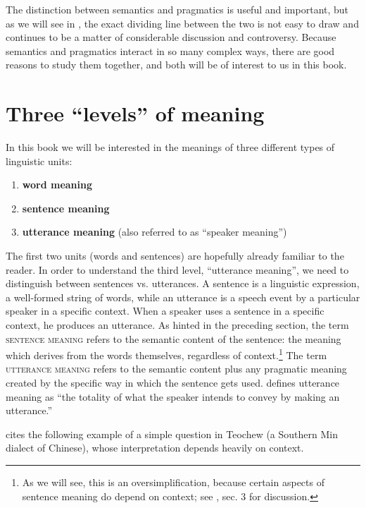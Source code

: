 The distinction between semantics and pragmatics is useful and important, but as we will see in , the exact dividing line between the two is not easy to draw and continues to be a matter of considerable discussion and controversy. Because semantics and pragmatics interact in so many complex ways, there are good reasons to study them together, and both will be of interest to us in this book.


\section{Three “levels” of meaning}\label{sec:1.2}

In this book we will be interested in the meanings of three different types of linguistic units:


\begin{enumerate}
\item \bfseries
word meaning
\item \bfseries
sentence meaning
\item \textbf{utterance meaning} (also referred to as “speaker meaning”)
\end{enumerate}

The first two units (words and sentences) are hopefully already familiar to the reader. In order to understand the third level, “utterance meaning”, we need to distinguish between sentences vs. utterances. A sentence is a linguistic expression, a well-formed string of words, while an utterance is a speech event by a particular speaker in a specific context. When a speaker uses a sentence in a specific context, he produces an utterance. As hinted in the preceding section, the term \textsc{sentence meaning} refers to the semantic content of the sentence: the meaning which derives from the words themselves, regardless of context.\footnote{As we will see, this is an oversimplification, because certain aspects of sentence meaning do depend on context; see , sec. 3 for discussion.} The term \textsc{utterance} \textsc{meaning} refers to the semantic content plus any pragmatic meaning created by the specific way in which the sentence gets used. \citet[27]{Cruse2000} defines utterance meaning as “the totality of what the speaker intends to convey by making an utterance.”



\citet[1]{Kroeger2005} cites the following example of a simple question in Teochew (a Southern Min dialect of Chinese), whose interpretation depends heavily on context.


